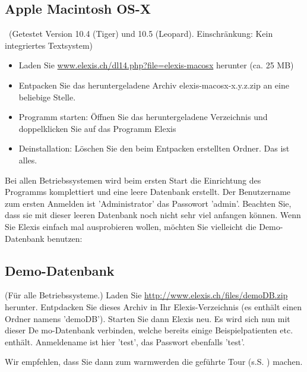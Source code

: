 \subsection{Apple Macintosh OS-X}\
(Getestet Version 10.4 (Tiger) und 10.5 (Leopard). Einschränkung: Kein integriertes Textsystem)
\index{Macintosh}\index{Apple}
\begin{itemize}
	\item Laden Sie \href{http://www.elexis.ch/dl14.php?file=elexis-macosx}{www.elexis.ch/dl14.php?file=elexis-macosx} herunter (ca. 25 MB)
	\item Entpacken Sie das heruntergeladene Archiv elexis-macosx-x.y.z.zip an eine beliebige Stelle.
    \item Programm starten: Öffnen Sie das herunter\-geladene Verzeichnis und doppel\-klic\-ken Sie auf das Pro\-gramm \glqq Elexis\grqq{}
	\item Deinstallation: Löschen Sie den beim Entpacken erstellten Ordner. Das ist alles.
\end{itemize}

Bei allen Betriebssystemen wird beim ersten Start die Einrichtung des Programms komplettiert und eine leere Datenbank erstellt. Der Benutzername zum ersten Anmelden ist 'Administrator' das Passowort 'admin'. Beachten Sie, dass sie mit dieser leeren Datenbank noch nicht sehr viel anfangen können. Wenn Sie Elexis einfach mal ausprobieren wollen, möchten Sie vielleicht die Demo-Datenbank benutzen:

\subsection{Demo-Datenbank}
(Für alle Betriebssysteme.) Laden Sie \href{http://www.elexis.ch/files/demoDB.zip}{http://www.elexis.ch/files/demoDB.zip} herunter. Entpdacken Sie dieses Archiv in Ihr Elexis-Verzeichnis (es enthält einen Ordner namens 'demoDB'). Starten Sie dann Elexis neu. Es wird sich nun mit dieser De
mo-Datenbank verbinden, welche bereits einige Beispielpatienten etc. enthält. Anmeldename ist hier 'test', das Passwort ebenfalls 'test'.

Wir empfehlen, dass Sie dann zum \glqq warmwerden\grqq{} die geführte Tour (s.S.
\pageref{tour}) machen.

